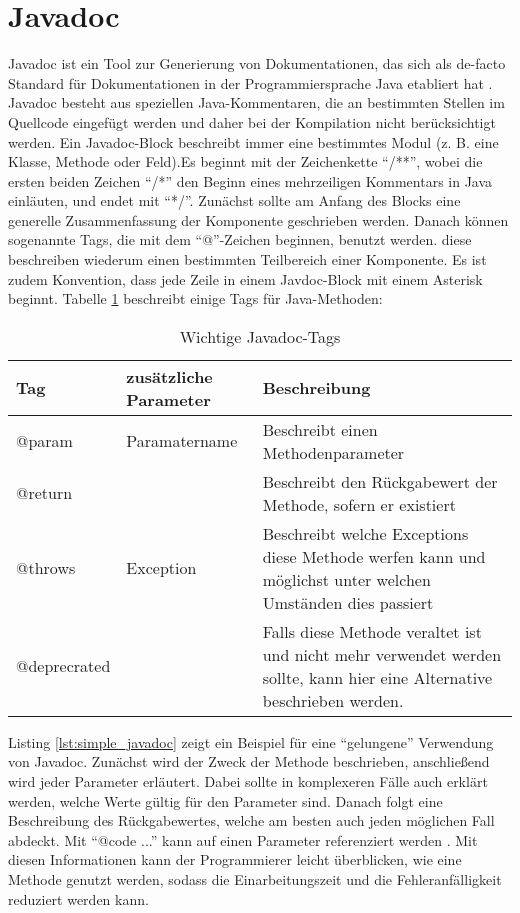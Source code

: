 \section{Javadoc}
Javadoc \cite{Javadoc} ist ein Tool zur Generierung von Dokumentationen, das sich als de-facto Standard für Dokumentationen in der Programmiersprache Java etabliert hat \cite[S. 249]{JavadocViolationsandTheirEvolutioninOpen-SourceSoftware}.  Javadoc besteht aus speziellen Java-Kommentaren, die an bestimmten Stellen im Quellcode eingefügt werden und daher bei der Kompilation nicht berücksichtigt werden. Ein Javadoc-Block beschreibt immer eine bestimmtes Modul (z. B. eine Klasse, Methode oder Feld).Es beginnt mit der Zeichenkette \enquote{/**}, wobei die ersten beiden Zeichen \enquote{/*} den Beginn eines mehrzeiligen Kommentars in Java einläuten, und endet mit \enquote{*/}. Zunächst sollte am Anfang des Blocks eine generelle Zusammenfassung der Komponente geschrieben werden. Danach können sogenannte Tags, die mit dem \enquote{@}-Zeichen beginnen, benutzt werden. diese beschreiben wiederum einen bestimmten Teilbereich einer Komponente. Es ist zudem Konvention, dass jede Zeile in einem Javdoc-Block mit einem Asterisk beginnt. Tabelle \ref{tab:table_javadoc_method} beschreibt einige Tags für Java-Methoden:
\begin{table}[h]
    \centering
    \begin{tabular}{m{4cm}|m{4cm}|m{7cm}}
    Tag & zusätzliche Parameter &Beschreibung\\
    \hline
        @param  & Paramatername & Beschreibt einen Methodenparameter\\
        \hline
         @return & & Beschreibt den Rückgabewert der Methode, sofern er existiert \\
         \hline
         @throws &Exception & Beschreibt welche Exceptions diese Methode werfen kann und möglichst unter welchen Umständen dies passiert \\
           \hline
         @deprecrated & & Falls diese Methode veraltet ist und nicht mehr verwendet werden sollte, kann hier eine Alternative beschrieben werden. \\
           \hline
         
           \hline
         
         
         
         
    \end{tabular}
    \caption{Wichtige Javadoc-Tags}
    \label{tab:table_javadoc_method}
\end{table}
Listing \ref{lst:simple_javadoc} zeigt ein Beispiel für eine  \enquote{gelungene} Verwendung von Javadoc. Zunächst wird der Zweck der Methode beschrieben, anschließend wird jeder Parameter erläutert. Dabei sollte in komplexeren Fälle auch erklärt werden, welche Werte gültig für den Parameter sind. Danach folgt eine Beschreibung des Rückgabewertes, welche am besten auch jeden möglichen Fall abdeckt. Mit \enquote{{@code ...}} kann auf einen Parameter referenziert werden . Mit diesen Informationen kann der Programmierer leicht überblicken, wie eine Methode genutzt werden, sodass die Einarbeitungszeit und die Fehleranfälligkeit reduziert werden kann.   
